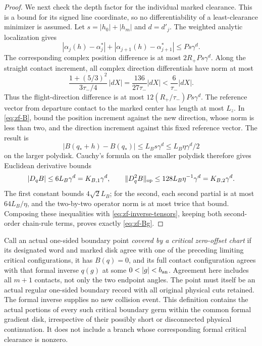 \begin{proof}
We next check the depth factor for the individual marked clearance.
This is a bound for its signed line coordinate, so no differentiability
of a least-clearance minimizer is assumed.  Let $s=|h_0|+|h_m|$ and
$d=d'_j$.  The weighted analytic localization gives
\[
 |\alpha_j(h)-\alpha_j^*|
       +|\alpha_{j+1}(h)-\alpha_{j+1}^*|
                       \le P s\gamma^d.
\]
The corresponding complex position difference is at most
$2R_+Ps\gamma^d$.  Along the straight contact increment, all
complex direction differentials have norm at most
\[
 \frac{1+(5/3)^2}{3\tau_-/4}\,|dX|
       =\frac{136}{27\tau_-}|dX|
       <\frac6{\tau_-}|dX|.
\]
Thus the flight-direction difference is at most
$12(R_+/\tau_-)Ps\gamma^d$.  The reference vector from departure
contact to the marked center has length at most $L_z$.  In
\eqref{eq:zf-B}, bound the position increment against the new
direction, whose norm is less than two, and the direction increment
against this fixed reference vector.  The result is
\[
 |B(q_*+h)-B(q_*)|\le L_Bs\gamma^d
                   \le L_B\eta\gamma^d/2
\]
on the larger polydisk.  Cauchy's formula on the smaller polydisk
therefore gives Euclidean derivative bounds
\[
 |D_qB|\le6L_B\gamma^d=K_{B,1}\gamma^d,
 \qquad
 \|D_q^2B\|_{\rm op}
          \le128L_B\eta^{-1}\gamma^d=K_{B,2}\gamma^d.
\]
The first constant bounds $4\sqrt2L_B$; for the second, each
second partial is at most $64L_B/\eta$, and the two-by-two operator
norm is at most twice that bound.  Composing these inequalities with
\eqref{eq:zf-inverse-tensors}, keeping both second-order chain-rule
terms, proves exactly \eqref{eq:zf-Bg}.
\end{proof}

Call an actual one-sided boundary point \emph{covered by a critical
zero-offset chart} if its designated word and marked disk agree with
one of the preceding limiting critical configurations, it has
$B(q)=0$, and its full contact configuration agrees with that formal
inverse $q(g)$ at some $0<|g|<b_{\rm an}$.  Agreement here includes
all $m+1$ contacts, not only the two endpoint angles.  The point must
itself be an actual regular one-sided boundary record with all
original physical cuts retained.  The formal inverse supplies no new
collision event.  This definition contains the actual portions of
every such critical boundary germ within the common formal gradient
disk, irrespective of their possibly short or disconnected physical
continuation.  It does not include a branch whose corresponding
formal critical clearance is nonzero.

